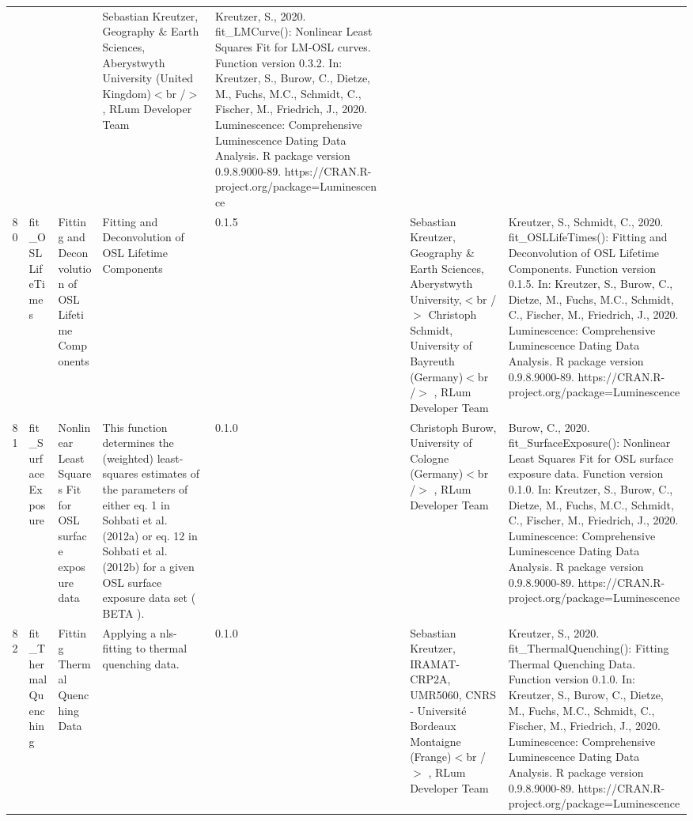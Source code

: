 \begin{table}[ht]
\begin{tabular}{rllllllll}
 &  &  & Sebastian Kreutzer, Geography \& Earth Sciences, Aberystwyth University (United Kingdom)$<$br /$>$ , RLum Developer Team & Kreutzer, S., 2020. fit\_LMCurve(): Nonlinear Least Squares Fit for LM-OSL curves. Function version 0.3.2. In: Kreutzer, S., Burow, C., Dietze, M., Fuchs, M.C., Schmidt, C., Fischer, M., Friedrich, J., 2020. Luminescence: Comprehensive Luminescence Dating Data Analysis. R package version 0.9.8.9000-89. https://CRAN.R-project.org/package=Luminescence
 \\ 
  80 & fit\_OSLLifeTimes & Fitting and Deconvolution of OSL Lifetime Components & Fitting and Deconvolution of OSL Lifetime Components & 0.1.5
 &  &  & Sebastian Kreutzer, Geography \& Earth Sciences, Aberystwyth University,$<$br /$>$ Christoph Schmidt, University of Bayreuth (Germany)$<$br /$>$ , RLum Developer Team & Kreutzer, S., Schmidt, C., 2020. fit\_OSLLifeTimes(): Fitting and Deconvolution of OSL Lifetime Components. Function version 0.1.5. In: Kreutzer, S., Burow, C., Dietze, M., Fuchs, M.C., Schmidt, C., Fischer, M., Friedrich, J., 2020. Luminescence: Comprehensive Luminescence Dating Data Analysis. R package version 0.9.8.9000-89. https://CRAN.R-project.org/package=Luminescence
 \\ 
  81 & fit\_SurfaceExposure & Nonlinear Least Squares Fit for OSL surface exposure data & This function determines the (weighted) least-squares estimates of the parameters of either eq. 1 in  Sohbati et al. (2012a)  or eq. 12 in Sohbati et al. (2012b)  for a given OSL surface exposure data set ( BETA ). & 0.1.0
 &  &  & Christoph Burow, University of Cologne (Germany)$<$br /$>$ , RLum Developer Team & Burow, C., 2020. fit\_SurfaceExposure(): Nonlinear Least Squares Fit for OSL surface exposure data. Function version 0.1.0. In: Kreutzer, S., Burow, C., Dietze, M., Fuchs, M.C., Schmidt, C., Fischer, M., Friedrich, J., 2020. Luminescence: Comprehensive Luminescence Dating Data Analysis. R package version 0.9.8.9000-89. https://CRAN.R-project.org/package=Luminescence
 \\ 
  82 & fit\_ThermalQuenching & Fitting Thermal Quenching Data & Applying a nls-fitting to thermal quenching data. & 0.1.0
 &  &  & Sebastian Kreutzer, IRAMAT-CRP2A, UMR5060, CNRS - Université Bordeaux Montaigne (Frange)$<$br /$>$ , RLum Developer Team & Kreutzer, S., 2020. fit\_ThermalQuenching(): Fitting Thermal Quenching Data. Function version 0.1.0. In: Kreutzer, S., Burow, C., Dietze, M., Fuchs, M.C., Schmidt, C., Fischer, M., Friedrich, J., 2020. Luminescence: Comprehensive Luminescence Dating Data Analysis. R package version 0.9.8.9000-89. https://CRAN.R-project.org/package=Luminescence

\end{tabular}
\end{table}
